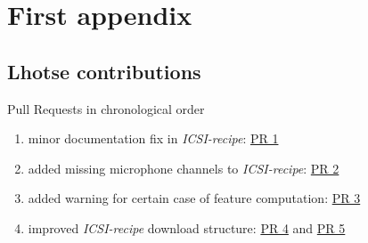 \documentclass[bsc,frontabs,parskip,deptreport]{infthesis}
\begin{document}
\chapter{First appendix}

\section{Lhotse contributions} \label{app:lhotse-contrib}
Pull Requests in chronological order 
\begin{enumerate}
    \item minor documentation fix in \textit{ICSI-recipe}: \href{https://github.com/lhotse-speech/lhotse/pull/544}{PR 1}
    \item added missing microphone channels to \textit{ICSI-recipe}: \href{https://github.com/lhotse-speech/lhotse/pull/555}{PR 2}
    \item added warning for certain case of feature computation: \href{https://github.com/lhotse-speech/lhotse/pull/561}{PR 3}
    \item improved \textit{ICSI-recipe} download structure: \href{https://github.com/lhotse-speech/lhotse/pull/583}{PR 4} and \href{https://github.com/lhotse-speech/lhotse/pull/592}{PR 5}
\end{enumerate}
%
\end{document}
